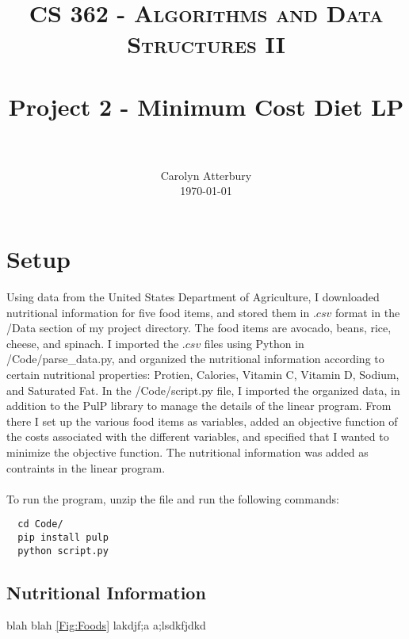 \documentclass[paper=a4, fontsize=11pt]{scrartcl}
\title{
		\usefont{OT1}{bch}{b}{n}
		\normalfont \normalsize \textsc{CS 362 - Algorithms and Data Structures II} \\ [25pt]
		\horrule{0.5pt} \\[0.4cm]
		\huge Project 2 - Minimum Cost Diet LP \\
		\horrule{2pt} \\[0.5cm]
}
\author{
		\normalfont 								\normalsize
        Carolyn Atterbury\\[-3pt]		\normalsize
        \today
}
\date{}
\numberwithin{equation}{section}		%
\numberwithin{figure}{section}			%
\numberwithin{table}{section}				%
\begin{document}
\lstset{language=bash}

\maketitle
\section{Setup}
Using data from the United States Department of Agriculture, I downloaded nutritional information for five food items, and stored them in $.csv$ format in the /Data section of my project directory. The food items are avocado, beans, rice, cheese, and spinach. I imported the $.csv$ files using Python in /Code/parse\_data.py, and organized the nutritional information according to certain nutritional properties: Protien, Calories, Vitamin C, Vitamin D, Sodium, and Saturated Fat. In the /Code/script.py file, I imported the organized data, in addition to the PulP library to manage the details of the linear program. From there I set up the various food items as variables, added an objective function of the costs associated with the different variables, and specified that I wanted to minimize the objective function. The nutritional information was added as contraints in the linear program. \\\\

To run the program, unzip the file and run the following commands:
\begin{lstlisting}
  cd Code/
  pip install pulp
  python script.py
\end{lstlisting}


\subsection{Nutritional Information}
blah blah \autoref{Fig:Foods} lakdjf;a a;lsdkfjdkd 
\end{document}
